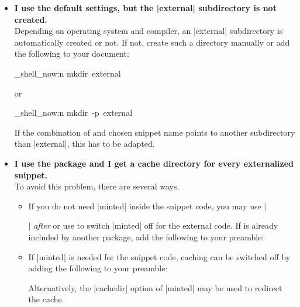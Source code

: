 \begin{itemize}

\item\textbf{I use the default settings, but the |external| subdirectory is
  not created.}\\
  Depending on operating system and compiler, an |external| subdirectory is
  automatically created or not. If not, create such a directory manually
  or add the following to your document:
\begin{dispListing}
\ExplSyntaxOn
\sys_shell_now:n { mkdir~external }
\ExplSyntaxOff
\end{dispListing}
or
\begin{dispListing}
\ExplSyntaxOn
\sys_shell_now:n { mkdir~-p~external }
\ExplSyntaxOff
\end{dispListing}
  If the combination of  and chosen snippet
  name points to another subdirectory than |external|, this has to be
  adapted.

\item\textbf{I use the  package and I get a cache directory for
  every externalized snippet.}\\
  To avoid this problem, there are several ways.
  \begin{itemize}
  \item If you do not need |minted| inside the snippet code, you may use
    |\usepackage{minted}| \emph{after} 
    or use  to switch |minted| off for the external code.
    If  is already included by another package, add the following to
    your preamble:
\begin{dispListing}
\end{dispListing}
  \item If |minted| is needed for the snippet code, caching can be switched
    off by adding the following to your preamble:
\begin{dispListing}
\end{dispListing}
  Alternatively, the |cachedir| option of |minted| may be used to redirect
  the cache.
  \end{itemize}


\end{itemize}

